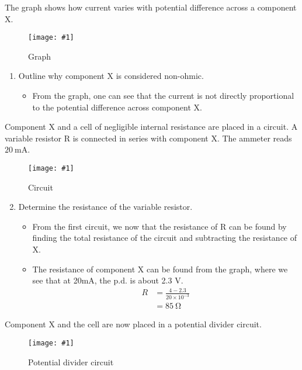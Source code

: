 \documentclass[a4paper,12pt]{article}
\newcommand{\img}[4]{\begin{center}
  \begin{figure}[H]
    \centering
    \texttt{[image: \#1]}
    \caption{#3}
    \label{fig:#4}
  \end{figure}
\end{center}}
\begin{document}
The graph shows how current varies with potential difference across a component X.

\img{ex/21.png}{0.8}{Graph}{ex21}

\begin{enumerate}[label=(\alph*)]
  \item Outline why component X is considered non-ohmic.
        \begin{itemize}
          \item From the graph, one can see that the current is not directly proportional to the potential difference across component X.
        \end{itemize}
\end{enumerate}


Component X and a cell of negligible internal resistance are placed in a circuit. A variable resistor R is connected in series with component X. The ammeter reads $\SI{20}{\m\A}$.

\img{ex/22.png}{0.4}{Circuit}{ex22}

\begin{enumerate}[label=(\alph*)]
  \setcounter{enumi}{1}
  \item Determine the resistance of the variable resistor.
        \begin{itemize}
          \item From the first circuit, we now that the resistance of R can be found by finding the total resistance of the circuit and subtracting the resistance of X.
          \item The resistance of component X can be found from the graph, where we see that at 20mA, the p.d. is about 2.3 V.
                \begin{align*}
                  R & = \frac{4 - 2.3}{20 \times 10^{-3}} \\
                    & = \SI{85}{\ohm}
                \end{align*}
        \end{itemize}
\end{enumerate}

Component X and the cell are now placed in a potential divider circuit.

\img{ex/23.png}{0.4}{Potential divider circuit}{ex23}
\end{document}
